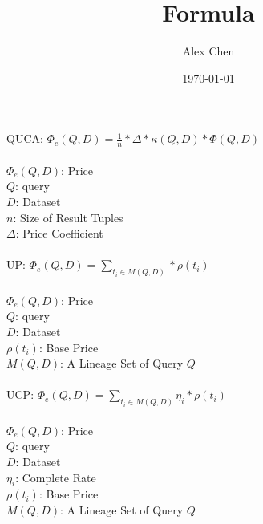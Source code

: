 \documentclass{article}
\title{Formula}
\author{Alex Chen}
\date{\today}
\begin{document}
\maketitle


\newpage

QUCA: $\Phi_e(Q, D) = \frac{1}{n} * \Delta * \kappa(Q, D) * \Phi(Q, D)$\\
\\$\Phi_e(Q, D)$: Price
\\$Q$: query
\\$D$: Dataset
\\$n$: Size of Result Tuples
\\$\Delta$: Price Coefficient
\\
\\

UP: $\Phi_e(Q, D) = \sum_{t_i \in M(Q, D)} * \rho(t_i)$\\
\\$\Phi_e(Q, D)$: Price
\\$Q$: query
\\$D$: Dataset
\\$\rho(t_i)$: Base Price
\\$M(Q, D)$: A Lineage Set of Query $Q$
\\
\\

UCP: $\Phi_e(Q, D) = \sum_{t_i \in M(Q, D)} \eta_i * \rho(t_i)$\\
\\$\Phi_e(Q, D)$: Price
\\$Q$: query
\\$D$: Dataset
\\$\eta_i$: Complete Rate
\\$\rho(t_i)$: Base Price
\\$M(Q, D)$: A Lineage Set of Query $Q$




	
\end{document}
